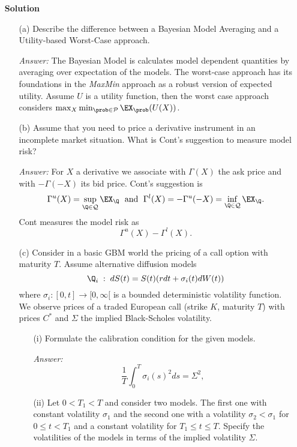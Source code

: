 \documentclass[11pt,a4paper,titlepage]{article}
\begin{document}
\begin{enumerate}
\item[]{\bf Solution}
\begin{itemize}
\item[(a)]
Describe the difference between a Bayesian Model Averaging and a Utility-based Worst-Case
approach.

{\it Answer:} The Bayesian Model is calculates model dependent quantities by averaging over  expectation of the models. The worst-case approach has its foundations in the {\it MaxMin} approach as a robust version of expected utility. Assume $U$ is a utility function, then
the worst case approach considers 
$\max _X \min_{\prob \in {\cal P}} \EX_{\prob}(U(X))$. 
 
\item[(b)] Assume that you need to price a derivative instrument in an incomplete market situation. What is Cont's suggestion to measure model risk?

{\it Answer:} 
For $X$ a derivative we associate with
$\Gamma(X)$ the ask price and with $-\Gamma(-X)$ its bid price.
Cont's suggestion is
$$
\Gamma^u(X)=\sup_{\Q \in {\cal Q}} \EX_{\Q} \; \mbox{ and } \;
\Gamma^l(X)= -\Gamma^u(-X)=\inf_{\Q \in {\cal Q}} \EX_{\Q}.
$$
Cont measures the model risk as 
$$
\Gamma^u(X)- 
\Gamma^l(X).
$$

\item[(c)] 
Consider in a basic GBM world the pricing of a call option with maturity $T$. 
Assume alternative diffusion models
\begin{equation}
\Q_i\;:\; dS(t) = S(t)(r dt + \sigma_i(t) dW(t))
\end{equation}
where $ \sigma_i: [0,t] \rightarrow [0, \infty[ $ is a bounded deterministic volatility function.
We observe prices of a traded European call (strike $K$, maturity $T$) with prices $C^*$ and
$\Sigma$ the implied Black-Scholes volatility.
\begin{itemize}
\item[(i)] 
Formulate the calibration condition for the given models.

{\it Answer:}  
\begin{equation}
\frac{1}{T} \int_0^T  \sigma_i(s)^2 ds = \Sigma^2,
\end{equation}
\item[(ii)]
Let $0< T_1 <T$ and consider two models. The first one with constant volatility $\sigma_1$ and the second one with a volatility $\sigma_2 < \sigma _1$ for $0 \leq t <T_1$ and a constant volatility for $T_1\leq t \leq T$. Specify  the  volatilities of the models in terms of the implied volatility $\Sigma $.


\end{itemize}
\end{itemize}
\end{enumerate}
\end{document}
